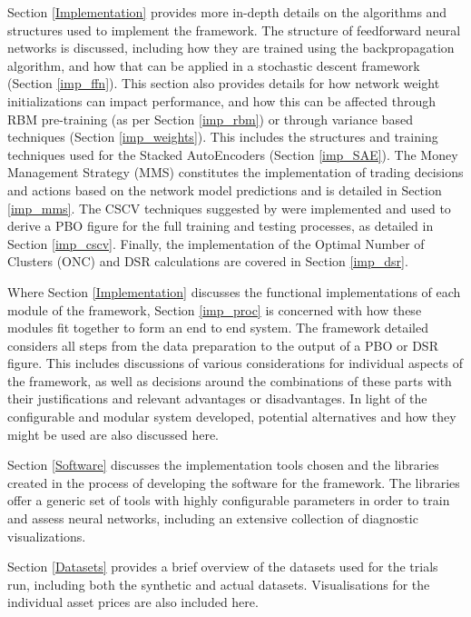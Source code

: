 \documentclass[a4paper,11pt,oneside]{article}
\theoremstyle{plain}
\theoremstyle{definition}
\begin{document}
	Section \ref{Implementation} provides more in-depth details on the algorithms and structures used to implement the framework. The structure of feedforward neural networks is discussed, including how they are trained using the backpropagation algorithm, and how that can be applied in a stochastic descent framework (Section \ref{imp_ffn}). This section also provides details for how network weight initializations can impact performance, and how this can be affected through RBM pre-training (as per Section \ref{imp_rbm}) or through variance based techniques (Section \ref{imp_weights}). This includes the structures and training techniques used for the Stacked AutoEncoders (Section \ref{imp_SAE}). The Money Management Strategy (MMS) constitutes the implementation of trading decisions and actions based on the network model predictions and is detailed in Section \ref{imp_mms}. The CSCV techniques suggested by \citet{BailyPBO} were implemented and used to derive a PBO figure for the full training and testing processes, as detailed in Section \ref{imp_cscv}. Finally, the implementation of the Optimal Number of Clusters (ONC) and DSR calculations are covered in Section \ref{imp_dsr}.\newline

	Where Section \ref{Implementation} discusses the functional implementations of each module of the framework, Section \ref{imp_proc} is concerned with how these modules fit together to form an end to end system. The framework detailed considers all steps from the data preparation to the output of a PBO or DSR figure. This includes discussions of various considerations for individual aspects of the framework, as well as decisions around the combinations of these parts with their justifications and relevant advantages or disadvantages. In light of the configurable and modular system developed, potential alternatives and how they might be used are also discussed here.\newline

	Section \ref{Software} discusses the implementation tools chosen and the libraries created in the process of developing the software for the framework. The libraries offer a generic set of tools with highly configurable parameters in order to train and assess neural networks, including an extensive collection of diagnostic visualizations.\newline

	Section \ref{Datasets} provides a brief overview of the datasets used for the trials run, including both the synthetic and actual datasets. Visualisations for the individual asset prices are also included here.\newline
\end{document}
